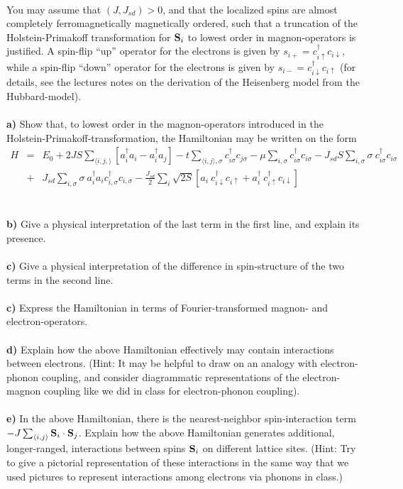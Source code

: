 \begin{problem}
\begin{eqnarray}
\end{eqnarray}
You may assume that $(J,J_{sd}) > 0$, and that the localized spins are almost completely ferromagnetically magnetically ordered, such that a truncation of the Holstein-Primakoff transformation for ${\bf S}_i$ to lowest order in magnon-operators is justified. A spin-flip ``up'' operator for the electrons is given by 
${s}_{i+} = c^{\dagger}_{i \uparrow} c_{i \downarrow}$, while a spin-flip ``down'' operator for the electrons is given by 
${s}_{i-} = c^{\dagger}_{i \downarrow} c_{i \uparrow}$ 
(for details, see the lectures notes on the derivation of the Heisenberg model from the Hubbard-model).   
\ \\
\ \\
{\bf a)} Show that, to lowest order in the magnon-operators introduced in the Holstein-Primakoff-transformation,  the Hamiltonian may be written on the form
\begin{eqnarray}
	H & = & E_0 + 2JS \sum_{\langle i,j, \rangle} \left[ a^{\dagger}_i a_i -  a^{\dagger}_i a_j  \right]
	- t \sum_{\langle i,j \rangle, \sigma } c^{\dagger}_{i \sigma}c_{j \sigma} - \mu \sum_{i,\sigma} c^{\dagger}_{i \sigma}c_{i \sigma}
	- J_{sd}  S \sum_{i,\sigma} \sigma ~c^{\dagger}_{i \sigma}c_{i \sigma} \nonumber \\
	& + & J_{sd} \sum_{i,\sigma} \sigma ~
	a^{\dagger}_{i} a_{i} c^{\dagger}_{i, \sigma} c_{i,\sigma} - \frac{J_{sd}}{2} \sum_i \sqrt{2S}\left[ a_i  ~c^{\dagger}_{i \downarrow} c_{i \uparrow}+ a^{\dagger}_{i} ~ c^{\dagger}_{i \uparrow} c_{i \downarrow}  \right] \nonumber
\end{eqnarray}
\ \\
\ \\
{\bf b)} Give a physical interpretation of the last term in the first line, and explain its presence. 
\ \\
\ \\
{\bf c)} Give a physical interpretation of the difference in spin-structure of the two terms in the second line.
\ \\
\ \\
{\bf c)} Express the Hamiltonian in terms of Fourier-transformed magnon- and electron-operators. 
\ \\
\ \\
{\bf d)} Explain how the above Hamiltonian effectively may contain interactions between electrons. (Hint: It may be helpful to draw on an analogy with electron-phonon coupling, and consider diagrammatic representations of the electron-magnon coupling like we did in class for electron-phonon coupling). 
\ \\
\ \\
{\bf e)} In the above Hamiltonian, there is the nearest-neighbor spin-interaction term $-J \sum_{\langle i,j \rangle} {\bf S}_i \cdot {\bf S}_j$. Explain how the above Hamiltonian generates additional, longer-ranged, interactions between spins ${\bf S}_i$ on different lattice sites. (Hint: Try to give a pictorial representation of these interactions in the same way that we used pictures to represent interactions among electrons via phonons in class.)
\end{problem}



